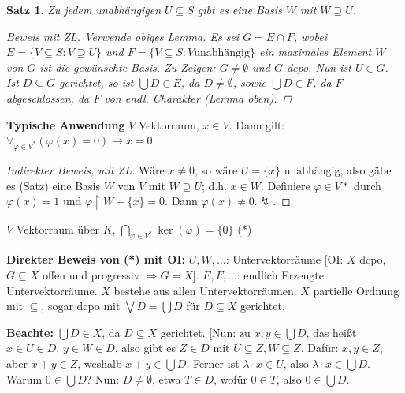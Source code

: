 \documentclass[headsepline=true,DIV=11]{scrartcl}
\newtheorem*{theorem}{Satz}
\theoremstyle{definition}
\newenvironment{gelaber}{}{}
\begin{document}

\begin{theorem}
	Zu jedem unabhängigen $U\subseteq S$ gibt es eine Basis $W$ mit $W\supseteq U$.
	\begin{proof}[Beweis mit ZL]
		Verwende obiges Lemma.
		Es sei $G=E\cap F$, wobei $E=\{V\subseteq S\colon V\supseteq U\}$ und 
		$F = \{V\subseteq S\colon V \text{unabhängig}\}$ ein maximales Element $W$ von $G$ ist die gewünschte Basis.
		Zu Zeigen: $G\neq \emptyset$ und $G$ dcpo.
		Nun ist $U\in G$.
		Ist $D\subseteq G$ gerichtet, so ist $\bigcup D\in E$, da $D\neq \emptyset$, sowie $\bigcup D\in F$, da $F$ abgeschlossen, da $F$ von endl. Charakter (Lemma oben).
	\end{proof}
\end{theorem}

\begin{gelaber}
	{\bf Typische Anwendung} $V$ Vektorraum, $x\in V$. 
	Dann gilt: $\forall_{\varphi \in V^*} ( \varphi(x)=0)\to x=0$.
	\begin{proof}[Indirekter Beweis, mit ZL]
		Wäre $x\neq 0$, so wäre $U=\{x\}$ unabhängig, also gäbe es (Satz) eine Basis $W$ von $V$ mit $W\supseteq U$; d.h. $x\in W$.
		Definiere $\varphi \in V*$ durch $\varphi(x)=1$ und $\varphi\upharpoonright W-\{x\}=0$.
		Dann $\varphi(x)\neq 0$.$\lightning$.
	\end{proof}
\end{gelaber}



$V$ Vektorraum über $K$, $\bigcap\limits_{\varphi\in V^*} \ker(\varphi)=\{0\}$ (*)

{\bf Direkter Beweis von (*) mit OI:} $U, W, \ldots$: Untervektorräume [OI: $X$ dcpo, $G\subseteq X$ offen und progressiv $\Rightarrow G=X$]. $E, F,
\ldots$: endlich Erzeugte Untervektorräume. $X$ bestehe aus allen Untervektorräumen. $X$ partielle Ordnung mit $\subseteq$, sogar dcpo mit $\bigvee
D=\bigcup D$ für $D\subseteq X$ gerichtet.

{\bf Beachte:} $\bigcup D\in X$, da $D\subseteq X$ gerichtet. [Nun: zu $x,y\in \bigcup D$, das heißt $x\in U\in D$, $y\in W\in D$, also gibt es $Z\in
  D$ mit $U\subseteq Z, W\subseteq Z$. Dafür: $x, y\in Z$, aber $x+y\in Z$, weshalb $x+y\in\bigcup D$. Ferner ist $\lambda\cdot x\in U$, also
  $\lambda\cdot x\in\bigcup D$. Warum $0\in\bigcup D$? Nun: $D\neq\emptyset$, etwa $T\in D$, wofür $0\in T$, also $0\in\bigcup D$.
\end{document}
